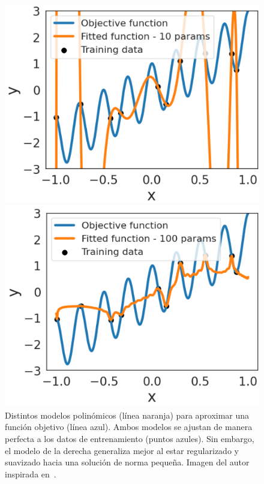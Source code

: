 \begin{figure}[h!]
    \centering
    \begin{minipage}{0.45\textwidth}
        \centering
        \includegraphics[width=\linewidth]{img/experiments/legendre1.2.png}
    \end{minipage}
    \hfill
    \begin{minipage}{0.45\textwidth}
        \centering
        \includegraphics[width=\linewidth]{img/experiments/legendre1.3.png}
    \end{minipage}
    \caption[Distintos modelos polinómicos para aproximar una función.]{Distintos modelos polinómicos (línea naranja) para aproximar una función objetivo (línea azul). Ambos modelos se ajustan de manera perfecta a los datos de entrenamiento (puntos azules). Sin embargo, el modelo de la derecha generaliza mejor al estar regularizado y suavizado hacia una solución de norma pequeña. Imagen del autor inspirada en~\cite{Schaeffer2023}.}\label{fig:suavidad1}
\end{figure}

